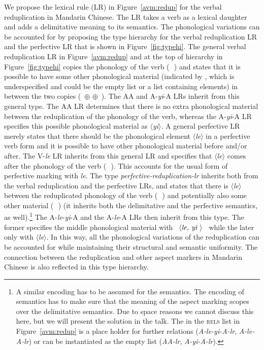 \documentclass[
a4paper,
10pt,
oneside,
]{scrartcl}
\newcommand{\iboxt}[1]{{%
  \setlength{\fboxsep}{1.25pt}%
  \fbox{$\scriptstyle #1$}%
}}
\newcommand{\ibox}[1]{%
\iboxt{#1}%
}
\newcommand{\iboxb}[1]{(\,\iboxt{#1}\,)}
\newlength{\MyetagLength}
\newcommand{\etag}{\ibox{\rule{0ex}{1.1ex}\hspace{\MyetagLength}}\xspace}
\newcommand{\type}[1]{{\normalfont\itshape #1\/}}
\newcommand{\relsl}{\textsc{rels} list\xspace}
\newcommand{\phonliste}[1]{%
\mbox{%
$%
%
\left\langle \mbox{\normalfont\itshape#1} \right\rangle%
$%
}%
}
\begin{document}
We propose the lexical rule (LR) in Figure~\ref{avm:redup} for the verbal reduplication in Mandarin
Chinese. The LR takes a verb as a lexical daughter and adds a delimitative meaning to its
semantics. The phonological variations can be accounted for by proposing the type hierarchy for the
verbal reduplication LR and the perfective LR that is shown in Figure~\ref{fig:typehi}. The general
verbal reduplication LR in Figure~\ref{avm:redup} and at the top of hierarchy in
Figure~\ref{fig:typehi} copies the phonology of the verb \iboxb{1} and states that it is possible to
have some other phonological material (indicated by \etag{}, which is underspecified and could be
the empty list or a list containing elements) in between the two copies (\,\ibox{1} $\oplus$
\etag $\oplus$ \ibox{1}\,). The AA and A-\emph{yi}-A LRs inherit
from this general type. The AA LR determines that there is no extra phonological material
between the reduplication of the phonology of the verb, whereas the A-\emph{yi}-A LR specifies this possible
phonological material as $\langle$\emph{yi}$\rangle$. A general perfective LR merely states that
there should be the phonological element $\langle$\emph{le}$\rangle$ in a perfective verb form and
it is possible to have other phonological material before and/or after. The V-\emph{le} LR inherits
from this general LR and specifies that $\langle$\emph{le}$\rangle$ comes after the phonology of the
verb (\,\etag{}\,). This accounts for the usual form of perfective marking with
\emph{le}. The type \type{perfective-reduplication-lr} inherits both from the verbal reduplication and the
perfective LRs, and states that there is $\langle$\emph{le}$\rangle$ between the reduplicated
phonology of the verb \iboxb{1} and potentially also some other material (\,\etag{}\,) (it inherits
both the delimitative and the perfective semantics, as well).\footnote{
A similar encoding has to be assumed for the semantics. The encoding of semantics has to make sure
that the meaning of the aspect marking scopes over the delimitative semantics. Due to space reasons
we cannot discuss this here, but we will present the solution in the talk. The \etag in the \relsl in Figure~\ref{avm:redup}
is a place holder for further relations (\type{A-le-yi-A-lr}, \type{A-le-A-lr}) or can be
instantiated as the empty list (\type{AA-lr}, \type{A-yi-A-lr}).
} The A-\emph{le}-\emph{yi}-A and the
A-\emph{le}-A LRs then inherit from this type. The former specifies the middle phonological material
with \phonliste{ le, yi } while the later only with $\langle$\emph{le}$\rangle$. In this way, all
the phonological variations of the reduplication can be accounted for while maintaining their
structural and semantic uniformity. The connection between the reduplication and other aspect
markers in Mandarin Chinese is also reflected in this type hierarchy.
\end{document}
